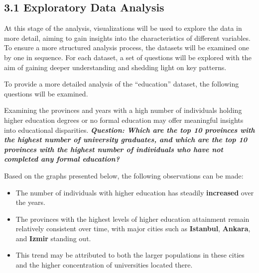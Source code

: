 \documentclass[
  11pt,
  a4paper,
  DIV=11,
  numbers=noendperiod]{scrartcl}
\begin{document}
\subsection{3.1 Exploratory Data
Analysis}\label{exploratory-data-analysis}

At this stage of the analysis, visualizations will be used to explore
the data in more detail, aiming to gain insights into the
characteristics of different variables. To ensure a more structured
analysis process, the datasets will be examined one by one in sequence.
For each dataset, a set of questions will be explored with the aim of
gaining deeper understanding and shedding light on key patterns.

To provide a more detailed analysis of the ``education'' dataset, the
following questions will be examined.

Examining the provinces and years with a high number of individuals
holding higher education degrees or no formal education may offer
meaningful insights into educational disparities.
{\textbf{\emph{Question: Which are the top 10 provinces with the highest
number of university graduates, and which are the top 10 provinces with
the highest number of individuals who have not completed any formal
education?}}}

Based on the graphs presented below, the following observations can be
made:

\begin{itemize}
\item
  The number of individuals with higher education has steadily
  {\textbf{increased}} over the years.
\item
  The provinces with the highest levels of higher education attainment
  remain relatively consistent over time, with major cities such as
  {\textbf{Istanbul}}, {\textbf{Ankara}}, and {\textbf{Izmir}} standing
  out.
\item
  This trend may be attributed to both the larger populations in these
  cities and the higher concentration of universities located there.
\end{itemize}
\end{document}
